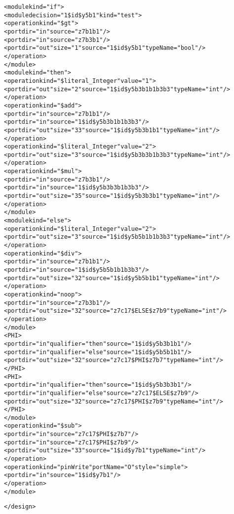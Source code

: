 \begin{alltt}
    <module kind="if">
      <module decision="1\$id\$y5b1" kind="test">
        <operation kind="\$gt">
          <port dir="in" source="z7b1b1"/>
          <port dir="in" source="z7b3b1"/>
          <port dir="out" size="1" source="1\$id\$y5b1" typeName="bool"/>
        </operation>
      </module>
      <module kind="then">
        <operation kind="\$literal\_Integer" value="1">
          <port dir="out" size="2" source="1\$id\$y5b3b1b1b3b3" typeName="int"/>
        </operation>
        <operation kind="\$add">
          <port dir="in" source="z7b1b1"/>
          <port dir="in" source="1\$id\$y5b3b1b1b3b3"/>
          <port dir="out" size="33" source="1\$id\$y5b3b1b1" typeName="int"/>
        </operation>
        <operation kind="\$literal\_Integer" value="2">
          <port dir="out" size="3" source="1\$id\$y5b3b3b1b3b3" typeName="int"/>
        </operation>
        <operation kind="\$mul">
          <port dir="in" source="z7b3b1"/>
          <port dir="in" source="1\$id\$y5b3b3b1b3b3"/>
          <port dir="out" size="35" source="1\$id\$y5b3b3b1" typeName="int"/>
        </operation>
      </module>
      <module kind="else">
        <operation kind="\$literal\_Integer" value="2">
          <port dir="out" size="3" source="1\$id\$y5b5b1b1b3b3" typeName="int"/>
        </operation>
        <operation kind="\$div">
          <port dir="in" source="z7b1b1"/>
          <port dir="in" source="1\$id\$y5b5b1b1b3b3"/>
          <port dir="out" size="32" source="1\$id\$y5b5b1b1" typeName="int"/>
        </operation>
        <operation kind="noop">
          <port dir="in" source="z7b3b1"/>
          <port dir="out" size="32" source="z7c17\$ELSE\$z7b9" typeName="int"/>
        </operation>
      </module>
      <PHI>
        <port dir="in" qualifier="then" source="1\$id\$y5b3b1b1"/>
        <port dir="in" qualifier="else" source="1\$id\$y5b5b1b1"/>
        <port dir="out" size="32" source="z7c17\$PHI\$z7b7" typeName="int"/>
      </PHI>
      <PHI>
        <port dir="in" qualifier="then" source="1\$id\$y5b3b3b1"/>
        <port dir="in" qualifier="else" source="z7c17\$ELSE\$z7b9"/>
        <port dir="out" size="32" source="z7c17\$PHI\$z7b9" typeName="int"/>
      </PHI>
    </module>
    <operation kind="\$sub">
      <port dir="in" source="z7c17\$PHI\$z7b7"/>
      <port dir="in" source="z7c17\$PHI\$z7b9"/>
      <port dir="out" size="33" source="1\$id\$y7b1" typeName="int"/>
    </operation>
    <operation kind="pinWrite" portName="O" style="simple">
      <port dir="in" source="1\$id\$y7b1"/>
    </operation>
  </module>

</design>
\end{alltt}